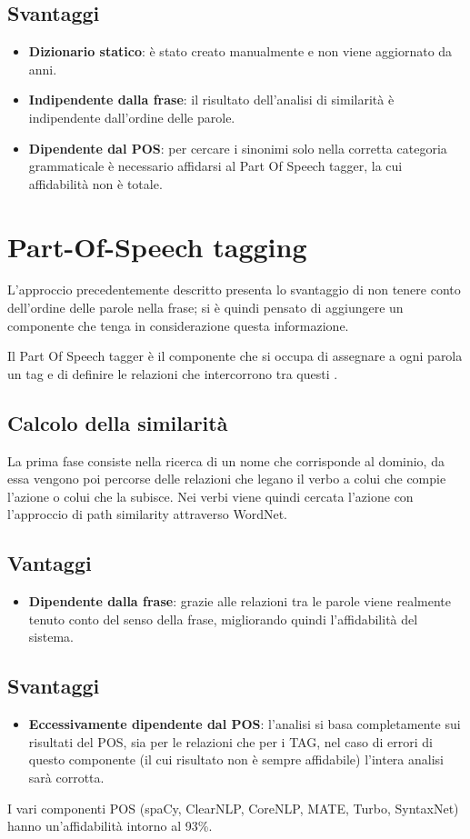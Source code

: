 \documentclass[twoside]{supsistudent}
\begin{document}
\subsection{Svantaggi}
\begin{itemize}
  \item \textbf{Dizionario statico}: è stato creato manualmente e non viene aggiornato da anni.  
  \item \textbf{Indipendente dalla frase}: il risultato dell'analisi di similarità è indipendente dall'ordine delle parole.
  \item \textbf{Dipendente dal POS}: per cercare i sinonimi solo nella corretta categoria grammaticale è necessario affidarsi al Part Of Speech tagger, la cui affidabilità non è totale.
\end{itemize}
\newpage
\section{Part-Of-Speech tagging}
L'approccio precedentemente descritto presenta lo svantaggio di non tenere conto dell'ordine delle parole nella frase; si è quindi pensato di aggiungere un componente che tenga in considerazione questa informazione.

Il Part Of Speech tagger è il componente che si occupa di assegnare a ogni parola un tag e di definire le relazioni che intercorrono tra questi .\cite{pos}\cite{posCategories}
\subsection{Calcolo della similarità}
La prima fase consiste nella ricerca di un nome che corrisponde al dominio, da essa vengono poi percorse delle relazioni che legano il verbo a colui che compie l'azione o colui che la subisce. Nei verbi viene quindi cercata l'azione con l'approccio di path similarity attraverso WordNet.
\subsection{Vantaggi}
\begin{itemize}
  \item \textbf{Dipendente dalla frase}: grazie alle relazioni tra le parole viene realmente tenuto conto del senso della frase, migliorando quindi l'affidabilità del sistema.
\end{itemize}
\subsection{Svantaggi}
\begin{itemize}
  \item \textbf{Eccessivamente dipendente dal POS}: l'analisi si basa completamente sui risultati del POS, sia per le relazioni che per i TAG, nel caso di errori di questo componente (il cui risultato non è sempre affidabile) l'intera analisi sarà corrotta.
\end{itemize}
I vari componenti POS (spaCy, ClearNLP, CoreNLP, MATE, Turbo, SyntaxNet) hanno un'affidabilità intorno al 93\%\cite{POS_scores}.
\end{document}
